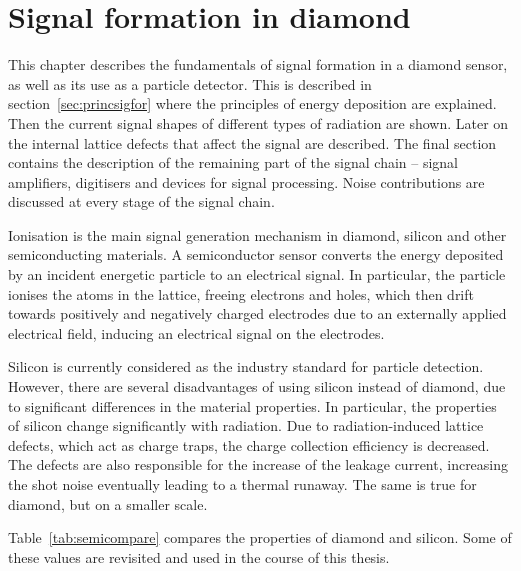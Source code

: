 
\chapter{Signal formation in diamond}
\label{ch:diamond}

This chapter describes the fundamentals of signal formation in a diamond sensor, as well as its use as a particle detector. This is described in section~\ref{sec:princsigfor} where the principles of energy deposition are explained. Then the current signal shapes of different types of radiation are shown. Later on the internal lattice defects that affect the signal are described. The final section contains the description of the remaining part of the signal chain -- signal amplifiers, digitisers and devices for signal processing. Noise contributions are discussed at every stage of the signal chain.

Ionisation is the main signal generation mechanism in diamond, silicon and other semiconducting materials. A semiconductor sensor converts the energy deposited by an incident energetic particle to an electrical signal. In particular, the particle ionises the atoms in the lattice, freeing electrons and holes, which then drift towards positively and negatively charged electrodes due to an externally applied electrical field, inducing an electrical signal on the electrodes. 

Silicon is currently considered as the industry standard for particle detection. However, there are several disadvantages of using silicon instead of diamond, due to significant differences in the material properties. In particular, the properties of silicon change significantly with radiation. Due to radiation-induced lattice defects, which act as charge traps, the charge collection efficiency is decreased. The defects are also responsible for the increase of the leakage current, increasing the shot noise eventually leading to a thermal runaway. The same is true for diamond, but on a smaller scale.

Table~\ref{tab:semicompare} compares the properties of diamond and silicon. Some of these values are revisited and used in the course of this thesis. 

